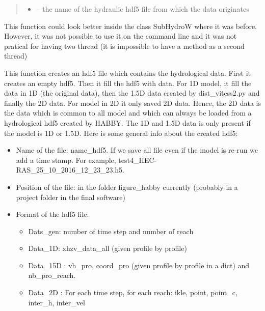 \documentclass[letterpaper,10pt,english]{sphinxmanual}
\begin{document}
\begin{fulllineitems}
\begin{quote}
\begin{description}
\begin{itemize}
\item {} 
 -- the name of the hydraulic hdf5 file from which the data originates

\end{itemize}

\end{description}\end{quote}


This function could look better inside the class SubHydroW where it was before. However, it was not possible
to use it on the command line and it was not pratical for having two thread (it is impossible to have a method
as a second thread)

This function creates an hdf5 file which contains the hydrological data. First it creates an empty hdf5.
Then it fill the hdf5 with data. For 1D model, it fill the data in 1D (the original data), then the 1.5D data
created by dist\_vitess2.py and finally the 2D data. For model in 2D it only saved 2D data. Hence, the 2D data
is the data which is common to all model and which can always be loaded from a hydrological hdf5 created by
HABBY. The 1D and 1.5D data is only present if the model is 1D or 1.5D. Here is some general info about the
created hdf5:
\begin{itemize}
\item {} 
Name of the file: name\_hdf5. If we save all file even if the model is re-run we add a time stamp.
For example, test4\_HEC-RAS\_25\_10\_2016\_12\_23\_23.h5.

\item {} 
Position of the file: in the folder  figure\_habby currently (probably in a project folder in the final software)

\item {} 
Format of the hdf5 file:
\begin{itemize}
\item {} 
Dats\_gen:  number of time step and number of reach

\item {} 
Data\_1D:  xhzv\_data\_all (given profile by profile)

\item {} 
Data\_15D :  vh\_pro, coord\_pro (given profile by profile in a dict) and nb\_pro\_reach.

\item {} 
Data\_2D : For each time step, for each reach: ikle, point, point\_c, inter\_h, inter\_vel


\end{itemize}
\end{itemize}
\end{fulllineitems}
\end{document}
